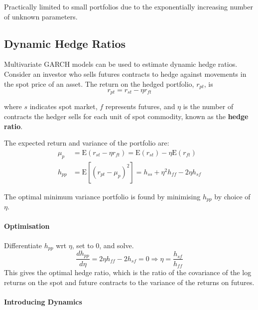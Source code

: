\documentclass[11pt]{article}
\begin{document}
Practically limited to small portfolios due to the exponentially increasing number of unknown parameters.

\subsection{Dynamic Hedge Ratios}

 Multivariate GARCH models can be used to estimate dynamic hedge ratios. Consider an investor who sells futures contracts to hedge against movements in the spot price of an asset. The return on the hedged portfolio, $r_{pt}$, is
 \[r_{pt} = r_{st} - \eta r_{ft}\]

 where $s$ indicates spot market, $f$ represents futures, and $\eta$ is the number of contracts the hedger sells for each unit of spot commodity, known as the \textbf{hedge ratio}.

 The expected return and variance of the portfolio are:
 \begin{equation}
\begin{aligned}
\mu_p & =\mathrm{E}\left(r_{s t}-\eta r_{f t}\right)=\mathrm{E}\left(r_{s t}\right)-\eta \mathrm{E}\left(r_{f t}\right) \\
h_{p p} & =\mathrm{E}\left[\left(r_{p t}-\mu_p\right)^2\right]=h_{s s}+\eta^2 h_{f f}-2 \eta h_{s f}
\end{aligned}
\end{equation}

The optimal minimum variance portfolio is found by minimising $h_{pp}$ by choice of $\eta$.


\paragraph{Optimisation}

\begin{procedure}
Differentiate $h_{pp}$ wrt $\eta$, set to 0, and solve.
\begin{equation}
\frac{d h_{p p}}{d \eta}=2 \eta h_{ff}-2 h_{sf}=0 \Rightarrow \eta=\frac{h_{sf}}{h_{ff}}
\end{equation}
This gives the optimal hedge ratio, which is the ratio of the covariance of the log returns on the spot and future contracts to the variance of the returns on futures.
\end{procedure}

\paragraph{Introducing Dynamics}\mbox{}
\end{document}
